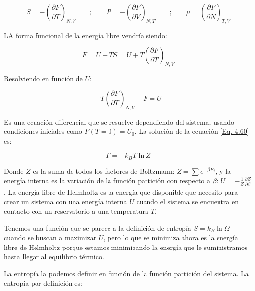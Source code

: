 \documentclass[11pt,fleqn]{book}
\begin{document}
\begin{equation}
        S=-\left(\frac{\partial F}{\partial T}\right)_{N,V}\qquad;\qquad P=-\left(\frac{\partial F}{\partial V}\right)_{N,T}\qquad;\qquad \mu=\left(\frac{\partial F}{\partial N}\right)_{T,V}
    \label{Eq. 4.59}
\end{equation}

LA forma funcional de la energía libre vendría siendo:

\begin{equation*}
    F=U-TS=U+T\left(\frac{\partial F}{\partial T}\right)_{N,V}
\end{equation*}

Resolviendo en función de $U$:

\begin{equation}
    -T\left(\frac{\partial F}{\partial T}\right)_{N,V}+F=U
    \label{Eq. 4.60}
\end{equation}

Es una ecuación diferencial que se resuelve dependiendo del sistema, usando condiciones iniciales como $F(T=0)=U_{0}$. La solución de la ecuación \ref{Eq. 4.60} es:

\begin{equation}
     F=-k_{B}T\ln{Z}
    \label{Eq. 4.61}
\end{equation}

Donde $Z$ es la suma de todos los factores de Boltzmann: $Z=\sum e^{-\beta E_{i}}$, y la energía interna es la variación de la función partición con respecto a $\beta$: $U=-\frac{1}{Z}\frac{\partial Z}{\partial\beta}$. La energía libre de Helmholtz es la energía que disponible que necesito para crear un sistema con una energía interna $U$ cuando el sistema se encuentra en contacto con un reservatorio a una temperatura $T$.

Tenemos una función que se parece a la definición de entropía $S=k_{B}\ln\Omega$ cuando se buscan a maximizar $U$, pero lo que se minimiza ahora es la energía libre de Helmholtz porque estamos minimizando  la energía que le suministramos hasta llegar al equilibrio térmico. 

La entropía la podemos definir en función de la función partición del sistema. La entropía por definición es:
\end{document}
